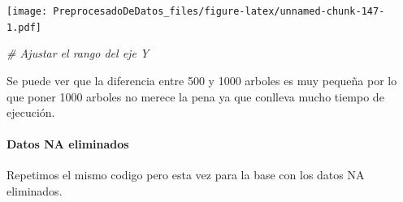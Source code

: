 \documentclass[
]{article}
\newenvironment{Shaded}{\begin{snugshade}}{\end{snugshade}}
\newcommand{\CommentTok}[1]{\textcolor[rgb]{0.56,0.35,0.01}{\textit{#1}}}
\begin{document}
\texttt{[image: PreprocesadoDeDatos\_files/figure-latex/unnamed-chunk-147-1.pdf]}

\begin{Shaded}
\begin{Highlighting}[]
  \CommentTok{\# Ajustar el rango del eje Y}
\end{Highlighting}
\end{Shaded}

Se puede ver que la diferencia entre 500 y 1000 arboles es muy pequeña
por lo que poner 1000 arboles no merece la pena ya que conlleva mucho
tiempo de ejecución.

\hypertarget{datos-na-eliminados}{%
\paragraph{Datos NA eliminados}\label{datos-na-eliminados}}

Repetimos el mismo codigo pero esta vez para la base con los datos NA
eliminados.
\end{document}
